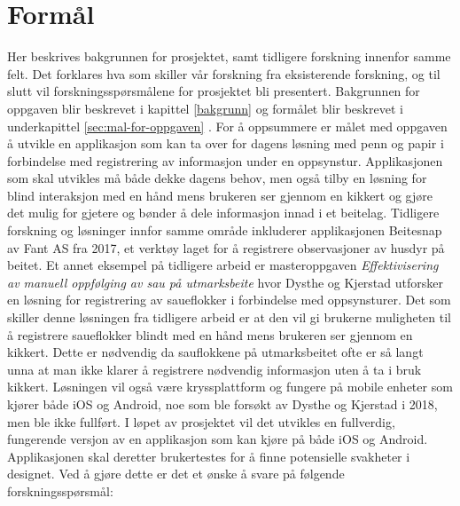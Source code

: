 \section{Formål}
Her beskrives bakgrunnen for prosjektet, samt tidligere forskning innenfor samme felt. Det forklares hva som skiller vår forskning fra eksisterende forskning, og til slutt vil forskningsspørsmålene for prosjektet bli presentert.
\newline
\newline
\noindent
Bakgrunnen for oppgaven blir beskrevet i kapittel \ref{bakgrunn}  og formålet blir beskrevet i underkapittel \ref{sec:mal-for-oppgaven} . For å oppsummere er målet med oppgaven å utvikle en applikasjon som kan ta over for dagens løsning med penn og papir i forbindelse med registrering av informasjon under en oppsynstur. Applikasjonen som skal utvikles må både dekke dagens behov, men også tilby en løsning for blind interaksjon med en hånd mens brukeren ser gjennom en kikkert og gjøre det mulig for gjetere og bønder å dele informasjon innad i et beitelag. Tidligere forskning og løsninger innfor samme område inkluderer applikasjonen Beitesnap \cite{BeitesnapRevolusjonerendeVerktoy} av Fant AS fra 2017, et verktøy laget for å registrere observasjoner av husdyr på beitet. Et annet eksempel på tidligere arbeid er masteroppgaven \textit{Effektivisering av manuell oppfølging av sau på utmarksbeite} hvor Dysthe og Kjerstad \cite{dystheEffektiviseringAvManuell2018} utforsker en løsning for registrering av saueflokker i forbindelse med oppsynsturer. Det som skiller denne løsningen fra tidligere arbeid er at den vil gi brukerne muligheten til å registrere saueflokker blindt med en hånd mens brukeren ser gjennom en kikkert. Dette er nødvendig da sauflokkene på utmarksbeitet ofte er så langt unna at man ikke klarer å registrere nødvendig informasjon uten å ta i bruk kikkert. Løsningen vil også være kryssplattform og fungere på mobile enheter som kjører både iOS og Android, noe som ble forsøkt av Dysthe og Kjerstad \cite{dystheEffektiviseringAvManuell2018} i 2018, men ble ikke fullført.
\newline
\newline
\noindent
I løpet av prosjektet vil det utvikles en fullverdig, fungerende versjon av en applikasjon som kan kjøre på både iOS og Android. Applikasjonen skal deretter brukertestes for å finne potensielle svakheter i designet. Ved å gjøre dette er det et ønske å svare på følgende forskningsspørsmål:

